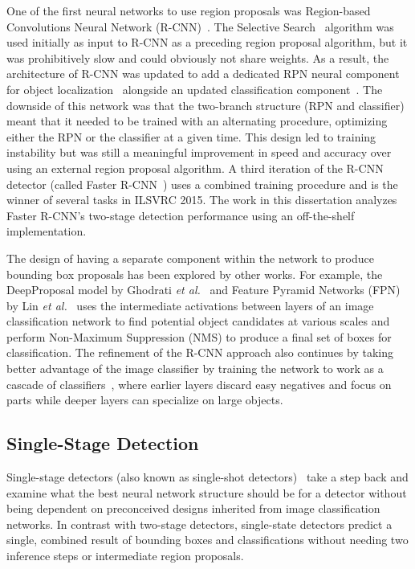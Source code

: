One of the first neural networks to use region proposals was Region-based Convolutions Neural Network (R-CNN)~\cite{girshick_rich_2014}.  The Selective Search~\cite{uijlings_selective_2013} algorithm was used initially as input to R-CNN as a preceding region proposal algorithm, but it was prohibitively slow and could obviously not share weights. As a result, the architecture of R-CNN was updated to add a dedicated RPN neural component for object localization~\cite{girshick_fast_2015} alongside an updated classification component~\cite{he_deep_2015}.  The downside of this network was that the two-branch structure (RPN and classifier) meant that it needed to be trained with an alternating procedure, optimizing either the RPN or the classifier at a given time.  This design led to training instability but was still a meaningful improvement in speed and accuracy over using an external region proposal algorithm.  A third iteration of the R-CNN detector (called Faster R-CNN~\cite{ren_faster_2015}) uses a combined training procedure and is the winner of several tasks in ILSVRC 2015. The work in this dissertation analyzes Faster R-CNN's two-stage detection performance using an off-the-shelf implementation.

The design of having a separate component within the network to produce bounding box proposals has been explored by other works. For example, the DeepProposal model by Ghodrati \textit{et al.}~\cite{ghodrati_deepproposal_2015} and Feature Pyramid Networks (FPN) by Lin \textit{et al.}~\cite{lin_feature_2017} uses the intermediate activations between layers of an image classification network to find potential object candidates at various scales and perform Non-Maximum Suppression (NMS) to produce a final set of boxes for classification.  The refinement of the R-CNN approach also continues by taking better advantage of the image classifier by training the network to work as a cascade of classifiers~\cite{cheng_revisiting_2018,cai_cascade_2017}, where earlier layers discard easy negatives and focus on parts while deeper layers can specialize on large objects.

\subsection{Single-Stage Detection} \label{sec:ssd}

Single-stage detectors (also known as single-shot detectors)~\cite{erhan_scalable_2014} take a step back and examine what the best neural network structure should be for a detector without being dependent on preconceived designs inherited from image classification networks.  In contrast with two-stage detectors, single-state detectors predict a single, combined result of bounding boxes and classifications without needing two inference steps or intermediate region proposals.

